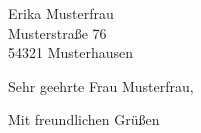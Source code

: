 \documentclass[sender]{scrlttr2}
\date{\today}
\begin{document}
\begin{letter}{%
  Erika Musterfrau \\
  Musterstraße 76 \\
  54321 Musterhausen
}


\opening{Sehr geehrte Frau Musterfrau,}

\lipsum[1-7]

\closing{Mit freundlichen Grüßen}



\end{letter}
\end{document}
